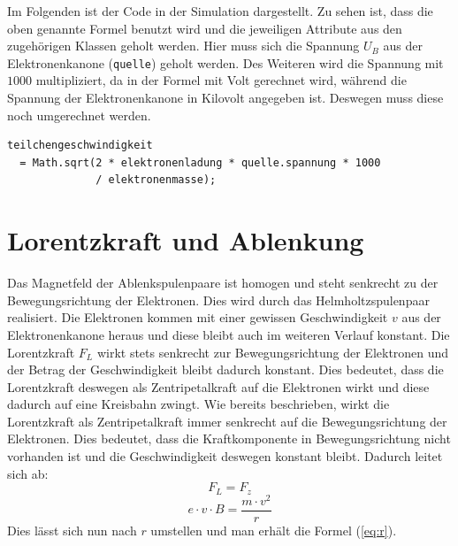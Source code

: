 
Im Folgenden ist der Code in der Simulation dargestellt.
Zu sehen ist, dass die oben genannte Formel benutzt wird und die jeweiligen Attribute aus den zugehörigen Klassen geholt werden.
Hier muss sich die Spannung $U_B$ aus der Elektronenkanone (\lstinline$quelle$)  geholt werden.
Des Weiteren wird die Spannung mit $1000$ multipliziert, da in der Formel mit Volt gerechnet wird, während die Spannung der Elektronenkanone in Kilovolt angegeben ist. Deswegen muss diese noch umgerechnet werden.

\begin{lstlisting}
teilchengeschwindigkeit 
  = Math.sqrt(2 * elektronenladung * quelle.spannung * 1000 
              / elektronenmasse);
\end{lstlisting}

\section{Lorentzkraft und Ablenkung}
\label{sec:a}

Das Magnetfeld der Ablenkspulenpaare ist homogen und steht senkrecht zu der Bewegungsrichtung der Elektronen.
Dies wird durch das Helmholtzspulenpaar realisiert.
Die Elektronen kommen mit einer gewissen Geschwindigkeit $v$ aus der Elektronenkanone heraus und diese bleibt auch im weiteren Verlauf konstant.
Die Lorentzkraft $F_L$ wirkt stets senkrecht zur Bewegungsrichtung der Elektronen und der Betrag der Geschwindigkeit bleibt dadurch konstant.
Dies bedeutet, dass die Lorentzkraft deswegen als Zentripetalkraft auf die Elektronen wirkt und diese dadurch auf eine Kreisbahn zwingt.
Wie bereits beschrieben, wirkt die Lorentzkraft als Zentripetalkraft immer senkrecht auf die Bewegungsrichtung der Elektronen.
Dies bedeutet, dass die Kraftkomponente in Bewegungsrichtung nicht vorhanden ist und die Geschwindigkeit deswegen konstant bleibt.
Dadurch leitet sich ab: 
$$ F_L=F_z$$
$$ e \cdot v \cdot B = \frac{m \cdot v^2}{r}$$
Dies lässt sich nun nach $r$ umstellen und man erhält die Formel (\ref{eq:r}).   


